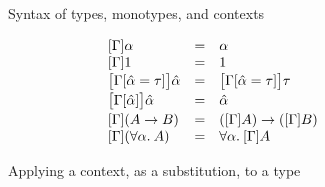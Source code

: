 \begin{figure}[h]
\begin{minipage}{0.6\textwidth}
  \captionsetup{justification=centering}\caption{Syntax of types, monotypes, and contexts}
  \end{minipage}
  \hfill
  \begin{minipage}{0.35\textwidth}
    \centering
      \[
  \begin{array}[t]{l@{~~~}c@{~~~}ll}
      [\Gamma]\alpha   & = &   \alpha &
      \\{}
      [\Gamma]\unitty   & = &   \unitty &
      \\[1pt]
      \big[\Gamma[\hypeq{\ahat}{\tau}]\big] \ahat
               & = &   \big[\Gamma[\hypeq{\ahat}{\tau}]\big]\tau &
      \\[2pt]
      \big[\Gamma[\ahat]\big]\ahat   & = &   \ahat &
      \\[2pt]
      [\Gamma](A \arr B)   & = &
          ([\Gamma]A) \arr ([\Gamma]B) &
      \\{}
      [\Gamma](\alltype{\alpha} A)
         & = & 
         \alltype{\alpha} [\Gamma]A & 
  \end{array}
  \]
  \captionsetup{justification=centering}\caption{Applying a context, as a substitution, to a type}
  \end{minipage}
\end{figure}


